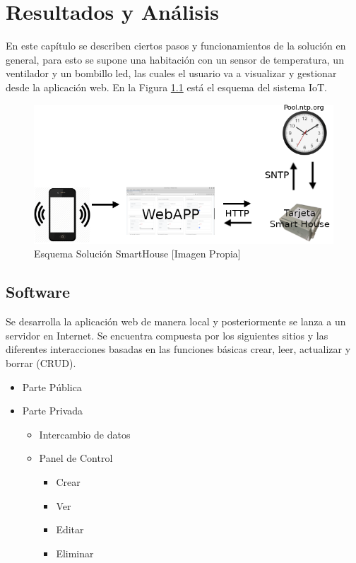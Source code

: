 \chapter{Resultados y Análisis}

En este capítulo se describen ciertos pasos y funcionamientos de la solución en general, para esto se supone una habitación con un sensor de temperatura, un ventilador y un bombillo led, las cuales el usuario va a visualizar y gestionar desde la aplicación web. En la Figura \ref{fig:iot} está el esquema del sistema IoT.

\begin{figure}[H]
	\centering
	\caption{Esquema Solución SmartHouse [Imagen Propia]}
	\label{fig:iot}
	\includegraphics[width=0.6\linewidth]{Imagenes/IOT}
\end{figure}

\section{Software}

Se desarrolla la aplicación web de manera local y posteriormente se lanza a un servidor en Internet. Se encuentra compuesta por los siguientes sitios y las diferentes interacciones basadas en las funciones básicas crear, leer, actualizar y borrar (CRUD).

\begin{itemize}
	\item Parte Pública
	\item Parte Privada
	\begin{itemize}
		\item Intercambio de datos
		\item Panel de Control
		\begin{itemize}
			\item Crear
			\item Ver
			\item Editar
			\item Eliminar 
		\end{itemize}
	\end{itemize}
\end{itemize}

